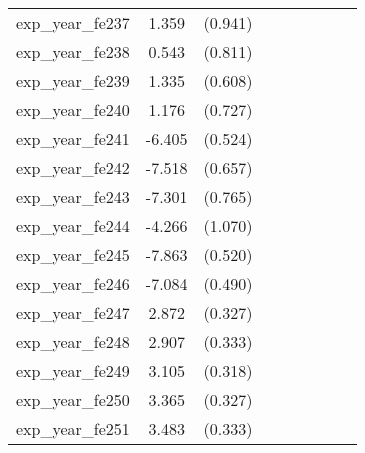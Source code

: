 {\begin{tabular}{l*{4}{cc}}
exp\_year\_fe237&    1.359         &  (0.941)&                  &         &                  &         &                  &         \\
exp\_year\_fe238&    0.543         &  (0.811)&                  &         &                  &         &                  &         \\
exp\_year\_fe239&    1.335\sym{*}  &  (0.608)&                  &         &                  &         &                  &         \\
exp\_year\_fe240&    1.176         &  (0.727)&                  &         &                  &         &                  &         \\
exp\_year\_fe241&   -6.405\sym{***}&  (0.524)&                  &         &                  &         &                  &         \\
exp\_year\_fe242&   -7.518\sym{***}&  (0.657)&                  &         &                  &         &                  &         \\
exp\_year\_fe243&   -7.301\sym{***}&  (0.765)&                  &         &                  &         &                  &         \\
exp\_year\_fe244&   -4.266\sym{***}&  (1.070)&                  &         &                  &         &                  &         \\
exp\_year\_fe245&   -7.863\sym{***}&  (0.520)&                  &         &                  &         &                  &         \\
exp\_year\_fe246&   -7.084\sym{***}&  (0.490)&                  &         &                  &         &                  &         \\
exp\_year\_fe247&    2.872\sym{***}&  (0.327)&                  &         &                  &         &                  &         \\
exp\_year\_fe248&    2.907\sym{***}&  (0.333)&                  &         &                  &         &                  &         \\
exp\_year\_fe249&    3.105\sym{***}&  (0.318)&                  &         &                  &         &                  &         \\
exp\_year\_fe250&    3.365\sym{***}&  (0.327)&                  &         &                  &         &                  &         \\
exp\_year\_fe251&    3.483\sym{***}&  (0.333)&                  &         &                  &         &                  &         \\

\end{tabular}}
